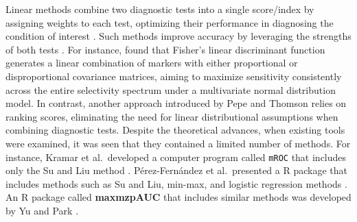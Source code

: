 Linear methods combine two diagnostic tests into a single score/index by assigning weights to each test, optimizing their performance in diagnosing the condition of interest \citep{neumann2023combining}. Such methods improve accuracy by leveraging the strengths of both tests \citep{aznar2022stepwise, bansal2013does}. For instance, \citet{su1993linear} found that Fisher's linear discriminant function generates a linear combination of markers with either proportional or disproportional covariance matrices, aiming to maximize sensitivity consistently across the entire selectivity spectrum under a multivariate normal distribution model. In contrast, another approach introduced by Pepe and Thomson \citep{pepe2000combining} relies on ranking scores, eliminating the need for linear distributional assumptions when combining diagnostic tests. Despite the theoretical advances, when existing tools were examined, it was seen that they contained a limited number of methods. For instance, Kramar et al.~developed a computer program called \texttt{mROC} that includes only the Su and Liu method \citep{kramar2001mroc}. Pérez-Fernández et al.~presented a  R package that includes methods such as Su and Liu, min-max, and logistic regression methods \citep{perez2021visualizing}. An R package called \textbf{maxmzpAUC} that includes similar methods was developed by Yu and Park \citep{yu2015two}.

